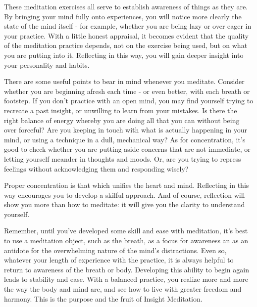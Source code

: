 
These meditation exercises all serve to establish awareness of things as
they are. By bringing your mind fully onto experiences, you will notice
more clearly the state of the mind itself - for example, whether you are
being lazy or over eager in your practice. With a little honest
appraisal, it becomes evident that the quality of the meditation
practice depends, not on the exercise being used, but on what you are
putting into it. Reflecting in this way, you will gain deeper insight
into your personality and habits.

There are some useful points to bear in mind whenever you meditate.
Consider whether you are beginning afresh each time - or even better,
with each breath or footstep. If you don't practice with an open mind,
you may find yourself trying to recreate a past insight, or unwilling to
learn from your mistakes. Is there the right balance of energy whereby
you are doing all that you can without being over forceful? Are you
keeping in touch with what is actually happening in your mind, or using
a technique in a dull, mechanical way? As for concentration, it's good
to check whether you are putting aside concerns that are not immediate,
or letting yourself meander in thoughts and moods. Or, are you trying to
repress feelings without acknowledging them and responding wisely?

Proper concentration is that which unifies the heart and mind.
Reflecting in this way encourages you to develop a skilful approach. And
of course, reflection will show you more than how to meditate: it will
give you the clarity to understand yourself.

Remember, until you've developed some skill and ease with meditation,
it's best to use a meditation object, such as the breath, as a focus for
awareness an as an antidote for the overwhelming nature of the mind's
distractions. Even so, whatever your length of experience with the
practice, it is always helpful to return to awareness of the breath or
body. Developing this ability to begin again leads to stability and
ease. With a balanced practice, you realize more and more the way the
body and mind are, and see how to live with greater freedom and harmony.
This is the purpose and the fruit of Insight Meditation.

